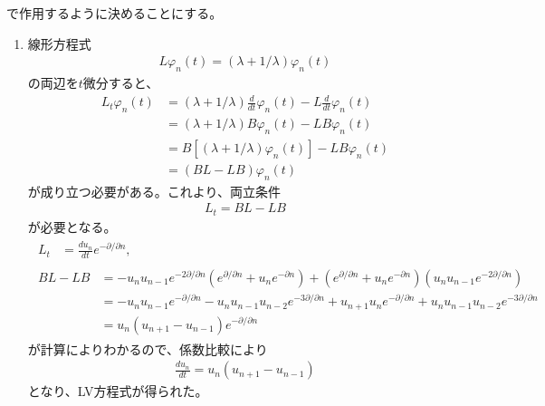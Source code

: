 \documentclass{jsarticle}
\begin{document}
で作用するように決めることにする。
\begin{enumerate}
\item 線形方程式
\begin{align}
L\varphi_{n}(t)=(\lambda+1/\lambda)\varphi_{n}(t)
\end{align}
の両辺を$t$微分すると、
\begin{align}
L_{t}\varphi_{n}(t)
&=(\lambda+1/\lambda)\frac{d}{dt}\varphi_{n}(t)
-L\frac{d}{dt}\varphi_{n}(t)\\
&=(\lambda+1/\lambda)B\varphi_{n}(t)-LB\varphi_{n}(t)\\
&=B\left[(\lambda+1/\lambda)\varphi_{n}(t)\right]-LB\varphi_{n}(t)\\
&=(BL-LB)\varphi_{n}(t)
\end{align}
が成り立つ必要がある。これより、両立条件
\begin{align}
L_{t}=BL-LB
\end{align}
が必要となる。
\begin{align}
\begin{split}
L_{t}&=\frac{du_{n}}{dt}e^{-\partial/\partial n},
\end{split}\\
\begin{split}
BL-LB&=-u_{n}u_{n-1}e^{-2\partial/\partial n}\left(e^{\partial/\partial n}+u_{n}e^{-\partial n}\right)
+\left(e^{\partial/\partial n}+u_{n}e^{-\partial n}\right)\left(u_{n}u_{n-1}e^{-2\partial/\partial n}\right)\\
&=-u_{n}u_{n-1}e^{-\partial/\partial n}-u_{n}u_{n-1}u_{n-2}e^{-3\partial/\partial n}
+u_{n+1}u_{n}e^{-\partial/\partial n}+u_{n}u_{n-1}u_{n-2}e^{-3\partial/\partial n}\\
&=u_{n}(u_{n+1}-u_{n-1})e^{-\partial/\partial n}
\end{split}
\end{align}
が計算によりわかるので、係数比較により
\begin{align}
\frac{du_{n}}{dt}=u_{n}(u_{n+1}-u_{n-1})
\end{align}
となり、LV方程式が得られた。


\end{enumerate}
\end{document}
